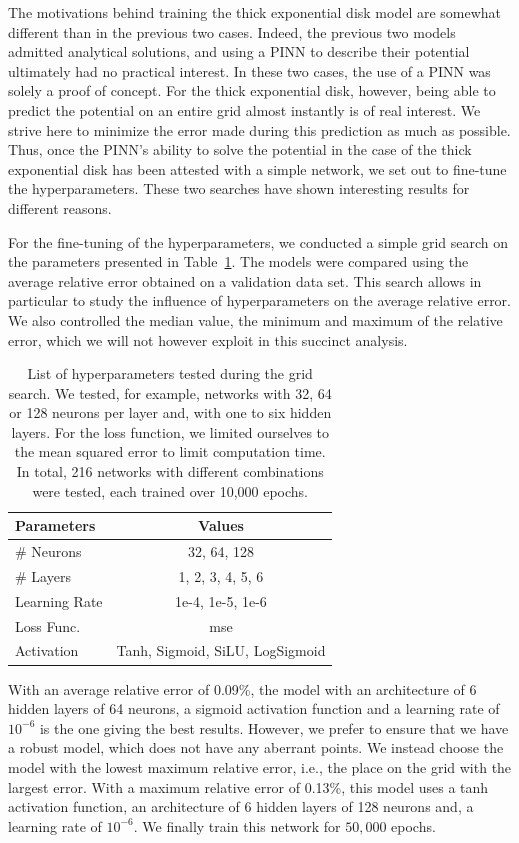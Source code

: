 The motivations behind training the thick exponential disk model are somewhat different than in the previous two cases. Indeed, the previous two models admitted analytical solutions, and using a PINN to describe their potential ultimately had no practical interest. In these two cases, the use of a PINN was solely a proof of concept. For the thick exponential disk, however, being able to predict the potential on an entire grid almost instantly is of real interest. We strive here to minimize the error made during this prediction as much as possible. Thus, once the PINN's ability to solve the potential in the case of the thick exponential disk has been attested with a simple network, we set out to fine-tune the hyperparameters. These two searches have shown interesting results for different reasons.

For the fine-tuning of the hyperparameters, we conducted a simple grid search on the parameters presented in Table~\ref{tab:fine-tuning}. The models were compared using the average relative error obtained on a validation data set. This search allows in particular to study the influence of hyperparameters on the average relative error. We also controlled the median value, the minimum and maximum of the relative error, which we will not however exploit in this succinct analysis.

\begin{table}[h]
\centering
\begin{tabular}{|l|c|}
\hline
\textbf{Parameters} & \textbf{Values} \\
    \hline
    \# Neurons & 32, 64, 128 \\
    \hline
    \# Layers & 1, 2, 3, 4, 5, 6 \\
    \hline
    Learning Rate & 1e-4, 1e-5, 1e-6 \\
    \hline
    Loss Func. & mse \\
    \hline
    Activation & Tanh, Sigmoid, SiLU, LogSigmoid \\
    \hline
\end{tabular}
\caption{List of hyperparameters tested during the grid search. We tested, for example, networks with 32, 64 or 128 neurons per layer and, with one to six hidden layers. For the loss function, we limited ourselves to the mean squared error to limit computation time. In total, 216 networks with different combinations were tested, each trained over 10,000 epochs.}
\label{tab:fine-tuning}
\end{table} With an average relative error of 0.09\%, the model with an architecture of 6 hidden layers of 64 neurons, a sigmoid activation function and a learning rate of $10^{-6}$ is the one giving the best results. However, we prefer to ensure that we have a robust model, which does not have any aberrant points. We instead choose the model with the lowest maximum relative error, i.e., the place on the grid with the largest error. With a maximum relative error of 0.13\%, this model uses a tanh activation function, an architecture of 6 hidden layers of 128 neurons and, a learning rate of $10^{-6}$. We finally train this network for $50,000$ epochs.

